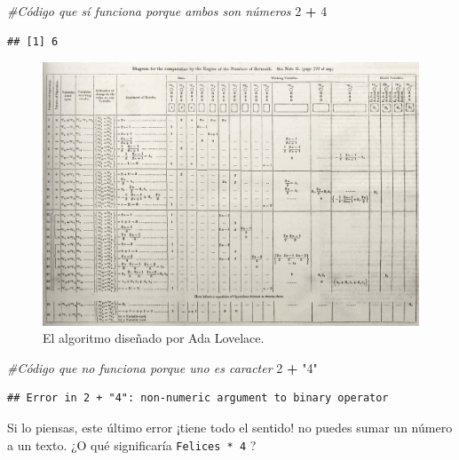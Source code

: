 \documentclass[
]{book}
\newenvironment{Shaded}{\begin{snugshade}}{\end{snugshade}}
\newcommand{\CommentTok}[1]{\textcolor[rgb]{0.56,0.35,0.01}{\textit{#1}}}
\newcommand{\DecValTok}[1]{\textcolor[rgb]{0.00,0.00,0.81}{#1}}
\newcommand{\OperatorTok}[1]{\textcolor[rgb]{0.81,0.36,0.00}{\textbf{#1}}}
\newcommand{\StringTok}[1]{\textcolor[rgb]{0.31,0.60,0.02}{#1}}
\begin{document}
\begin{Shaded}
\begin{Highlighting}[]
\CommentTok{#Código que sí funciona porque ambos son números}
\DecValTok{2} \OperatorTok{+}\StringTok{ }\DecValTok{4} 
\end{Highlighting}
\end{Shaded}

\begin{verbatim}
## [1] 6
\end{verbatim}

\begin{figure}

{\centering \includegraphics[width=26.67in]{images/algorithm_lovelace} 

}

\caption{El algoritmo diseñado por Ada Lovelace.}\label{fig:unnamed-chunk-38}
\end{figure}

\begin{Shaded}
\begin{Highlighting}[]
\CommentTok{#Código que no funciona porque uno es caracter}
\DecValTok{2} \OperatorTok{+}\StringTok{ "4"} 
\end{Highlighting}
\end{Shaded}

\begin{verbatim}
## Error in 2 + "4": non-numeric argument to binary operator
\end{verbatim}

Si lo piensas, este último error ¡tiene todo el sentido! no puedes sumar un número a un texto. ¿O qué significaría \texttt{\textquotesingle{}Felices\textquotesingle{}\ *\ 4} ?
\end{document}
